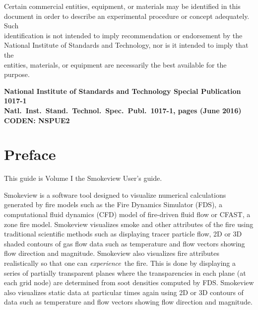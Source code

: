 \documentclass[11pt,twoside]{book}
\begin{document}
\begin{minipage}[t][9in][s]{6.5in}


\begin{flushright}
Certain commercial entities, equipment, or materials may be identified in this \\
document in order to describe an experimental procedure or concept adequately. Such \\
identification is not intended to imply recommendation or endorsement by the \\
National Institute of Standards and Technology, nor is it intended to imply that the \\
entities, materials, or equipment are necessarily the best available for the purpose.
\end{flushright}

\vspace{3in}


\vspace{3in}

\large
\begin{flushright}
\bf National Institute of Standards and Technology Special Publication 1017-1 \\
Natl.~Inst.~Stand.~Technol.~Spec.~Publ.~1017-1, \pageref{LastPage} pages (June 2016) \\
CODEN: NSPUE2
\end{flushright}

\vfill

\end{minipage}


\frontmatter

\pagestyle{plain}


\chapter{Preface}
\smvoverview
This guide is Volume I the  Smokeview User's guide.

Smokeview is a software tool designed to visualize numerical
calculations generated by fire models such as the Fire Dynamics
Simulator (FDS), a computational fluid dynamics (CFD) model of
fire-driven fluid flow or CFAST, a zone fire model. Smokeview
visualizes smoke and other attributes of the fire using
traditional scientific methods such as displaying tracer particle
flow, 2D or 3D shaded contours of gas flow data such as
temperature and flow vectors showing flow direction and magnitude.
Smokeview also visualizes fire attributes realistically so that
one can {\em experience}\ the fire. This is done by displaying a
series of partially transparent planes where the transparencies in
each plane (at each grid node) are determined from soot densities
computed by FDS.  Smokeview also visualizes static data at
particular times again using 2D or 3D contours of data such as
temperature and flow vectors showing flow direction and magnitude.
\end{document}
